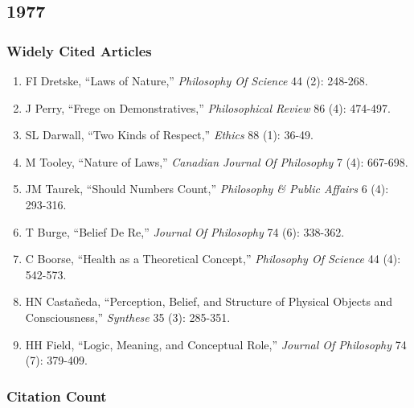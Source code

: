 \documentclass[
  10pt,
  letterpaper,
  DIV=11,
  numbers=noendperiod,
  twoside]{scrartcl}
\providecommand{\tightlist}{%
  \setlength{\itemsep}{0pt}\setlength{\parskip}{0pt}}\usepackage{longtable,booktabs,array}
\begin{document}
\newpage

\subsection{1977}\label{sec-s1977}

\subsubsection*{Widely Cited Articles}\label{widely-cited-articles-1}

\begin{enumerate}
\def\labelenumi{\arabic{enumi}.}
\tightlist
\item
  FI Dretske, ``Laws of Nature,'' \emph{Philosophy Of Science} 44 (2):
  248-268.
\item
  J Perry, ``Frege on Demonstratives,'' \emph{Philosophical Review} 86
  (4): 474-497.
\item
  SL Darwall, ``Two Kinds of Respect,'' \emph{Ethics} 88 (1): 36-49.
\item
  M Tooley, ``Nature of Laws,'' \emph{Canadian Journal Of Philosophy} 7
  (4): 667-698.
\item
  JM Taurek, ``Should Numbers Count,'' \emph{Philosophy \& Public
  Affairs} 6 (4): 293-316.
\item
  T Burge, ``Belief De Re,'' \emph{Journal Of Philosophy} 74 (6):
  338-362.
\item
  C Boorse, ``Health as a Theoretical Concept,'' \emph{Philosophy Of
  Science} 44 (4): 542-573.
\item
  HN Castañeda, ``Perception, Belief, and Structure of Physical Objects
  and Consciousness,'' \emph{Synthese} 35 (3): 285-351.
\item
  HH Field, ``Logic, Meaning, and Conceptual Role,'' \emph{Journal Of
  Philosophy} 74 (7): 379-409.
\end{enumerate}

\subsubsection*{Citation Count}\label{sec-count-1977}
\end{document}
